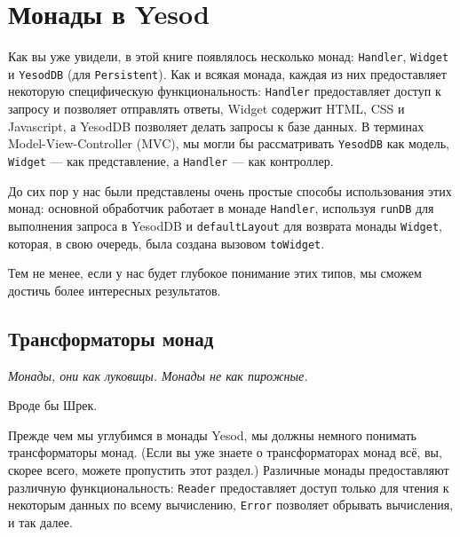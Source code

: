 \chapter{Монады в Yesod}\label{chap:yesod_monads}

Как вы уже увидели, в этой книге появлялось несколько монад: \lstinline'Handler',
\lstinline'Widget' и \lstinline'YesodDB'
(для \lstinline'Persistent'). Как и всякая монада, каждая из них предоставляет некоторую
специфическую функциональность: \lstinline'Handler' предоставляет доступ к запросу и
позволяет
отправлять ответы, Widget содержит HTML, CSS и Javascript, а YesodDB позволяет делать
запросы к базе данных. В терминах Model-View-Controller (MVC), мы могли бы рассматривать
\lstinline'YesodDB' как модель, \lstinline'Widget' --- как представление, а
\lstinline'Handler' --- как контроллер.

До сих пор у нас были представлены очень простые способы использования этих монад: 
основной обработчик работает в монаде \lstinline'Handler', используя \lstinline'runDB' для
выполнения запроса в YesodDB и \lstinline'defaultLayout' для возврата монады
\lstinline'Widget', которая, в свою очередь, была создана
вызовом \lstinline'toWidget'.

Тем не менее, если у нас будет глубокое понимание этих типов, мы сможем достичь более интересных результатов.

\section{Трансформаторы монад}

\vspace{1em}\hfill{}\begin{minipage}{150pt}{\begin{spacing}{0.9}
\small\noindent\textit{Монады, они как луковицы. Монады не как пирожные.}\end{spacing}
\vspace{1em}
\hfill{}{Вроде бы Шрек.}}\vspace{2em}
\end{minipage}

Прежде чем мы углубимся в монады Yesod, мы должны немного понимать трансформаторы монад. 
(Если вы уже знаете о трансформаторах монад всё, вы, скорее всего, можете пропустить этот
раздел.) Различные монады предоставляют различную функциональность: \lstinline'Reader'
предоставляет доступ только для чтения к некоторым данных по всему вычислению,
\lstinline'Error' позволяет обрывать вычисления, и так далее.

